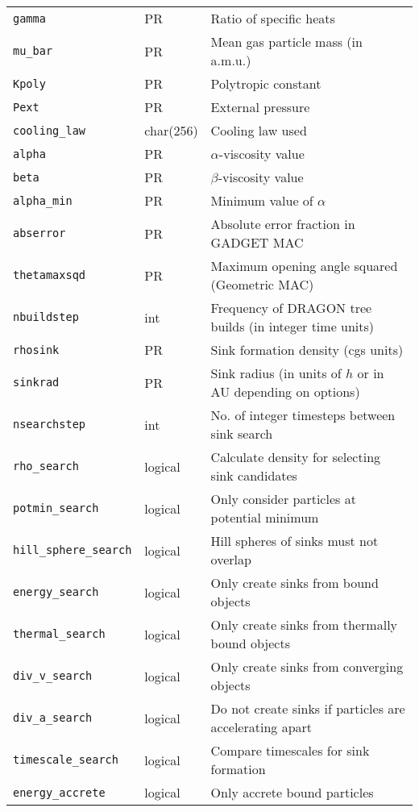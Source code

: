 \documentclass[a4paper]{article}
\newcommand{\var}[1]{\texttt{#1}}
\begin{document}
\begin{center}
\begin{supertabular}{|p{3cm}|p{2cm}|p{8cm}|}
\var{gamma}      & PR       & Ratio of specific heats \\
\var{mu\_bar}    & PR       & Mean gas particle mass (in a.m.u.) \\
\var{Kpoly}      & PR       & Polytropic constant \\ 
\var{Pext}       & PR       & External pressure \\ \hline
\var{cooling\_law} & char(256) & Cooling law used \\ \hline
\var{alpha}      & PR       & $\alpha$-viscosity value \\
\var{beta}       & PR       & $\beta$-viscosity value \\
\var{alpha\_min} & PR       & Minimum value of $\alpha$ \\ \hline
\var{abserror}   & PR       & Absolute error fraction in GADGET MAC \\ 
\var{thetamaxsqd}& PR       & Maximum opening angle squared (Geometric MAC) \\
\var{nbuildstep} & int      & Frequency of DRAGON tree builds (in integer time units) \\ \hline
\var{rhosink}    & PR       & Sink formation density (cgs units) \\
\var{sinkrad}    & PR       & Sink radius (in units of $h$ or in AU depending on options) \\
\var{nsearchstep} & int     & No. of integer timesteps between sink search \\
\var{rho\_search} & logical & Calculate density for selecting sink candidates \\
\var{potmin\_search} & logical & Only consider particles at potential minimum \\
\var{hill\_sphere\_search} & logical & Hill spheres of sinks must not overlap \\
\var{energy\_search}  & logical & Only create sinks from bound objects \\
\var{thermal\_search}  & logical & Only create sinks from thermally bound objects \\
\var{div\_v\_search}  & logical & Only create sinks from converging objects \\
\var{div\_a\_search}  & logical & Do not create sinks if particles are accelerating apart \\
\var{timescale\_search} & logical & Compare timescales for sink formation \\ \hline
\var{energy\_accrete} & logical & Only accrete bound particles \\

\end{supertabular}
\end{center}
\end{document}
